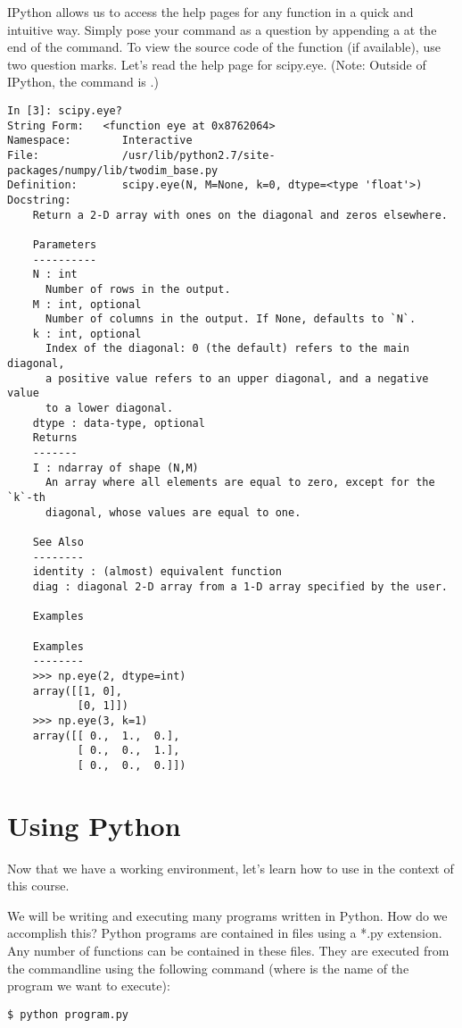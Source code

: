 IPython allows us to access the help pages for any function in a quick and intuitive way.  Simply pose your command as a question by appending a  at the end of the command.  To view the source code of the function (if available), use two question marks. Let's read the help page for scipy.eye. (Note: Outside of IPython, the command is .)
\begin{lstlisting}
In [3]: scipy.eye?
String Form:   <function eye at 0x8762064>
Namespace:        Interactive
File:             /usr/lib/python2.7/site-packages/numpy/lib/twodim_base.py
Definition:       scipy.eye(N, M=None, k=0, dtype=<type 'float'>)
Docstring:
    Return a 2-D array with ones on the diagonal and zeros elsewhere.

    Parameters
    ----------
    N : int
      Number of rows in the output.
    M : int, optional
      Number of columns in the output. If None, defaults to `N`.
    k : int, optional
      Index of the diagonal: 0 (the default) refers to the main diagonal,
      a positive value refers to an upper diagonal, and a negative value
      to a lower diagonal.
    dtype : data-type, optional
    Returns
    -------
    I : ndarray of shape (N,M)
      An array where all elements are equal to zero, except for the `k`-th
      diagonal, whose values are equal to one.

    See Also
    --------
    identity : (almost) equivalent function
    diag : diagonal 2-D array from a 1-D array specified by the user.

    Examples

    Examples
    --------
    >>> np.eye(2, dtype=int)
    array([[1, 0],
           [0, 1]])
    >>> np.eye(3, k=1)
    array([[ 0.,  1.,  0.],
           [ 0.,  0.,  1.],
           [ 0.,  0.,  0.]])
\end{lstlisting}

\section*{Using Python}
Now that we have a working environment, let's learn how to use in the context of this course.

We will be writing and executing many programs written in Python.  How do we accomplish this?  Python programs are contained in files using a *.py extension.  Any number of functions can be contained in these files.  They are executed from the commandline using the following command (where  is the name of the program we want to execute):
\begin{lstlisting}
$ python program.py
\end{lstlisting}

